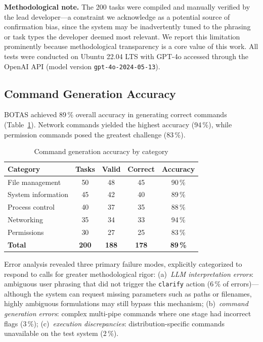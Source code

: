 \documentclass[10pt,a4paper]{article}
\begin{document}
\textbf{Methodological note.} The 200 tasks were compiled and manually verified by the lead developer---a constraint we acknowledge as a potential source of confirmation bias, since the system may be inadvertently tuned to the phrasing or task types the developer deemed most relevant. We report this limitation prominently because methodological transparency is a core value of this work. All tests were conducted on Ubuntu 22.04 LTS with GPT-4o accessed through the OpenAI API (model version \texttt{gpt-4o-2024-05-13}).

\subsection{Command Generation Accuracy}
\label{subsec:results-accuracy}

BOTAS achieved 89\,\% overall accuracy in generating correct commands (Table~\ref{tab:accuracy}). Network commands yielded the highest accuracy (94\,\%), while permission commands posed the greatest challenge (83\,\%).

\begin{table}[H]
    \centering
    \caption{Command generation accuracy by category}
    \label{tab:accuracy}
    \begin{tabular}{@{}lcccc@{}}
        \toprule
        \textbf{Category} & \textbf{Tasks} & \textbf{Valid} & \textbf{Correct} & \textbf{Accuracy} \\
        \midrule
        File management         & 50 & 48 & 45 & 90\,\% \\
        System information      & 45 & 42 & 40 & 89\,\% \\
        Process control         & 40 & 37 & 35 & 88\,\% \\
        Networking              & 35 & 34 & 33 & 94\,\% \\
        Permissions             & 30 & 27 & 25 & 83\,\% \\
        \midrule
        \textbf{Total}          & \textbf{200} & \textbf{188} & \textbf{178} & \textbf{89\,\%} \\
        \bottomrule
    \end{tabular}
\end{table}

Error analysis revealed three primary failure modes, explicitly categorized to respond to calls for greater methodological rigor: (a)~\textit{LLM interpretation errors}: ambiguous user phrasing that did not trigger the \texttt{clarify} action (6\,\% of errors)---although the system can request missing parameters such as paths or filenames, highly ambiguous formulations may still bypass this mechanism; (b)~\textit{command generation errors}: complex multi-pipe commands where one stage had incorrect flags (3\,\%); (c)~\textit{execution discrepancies}: distribution-specific commands unavailable on the test system (2\,\%).
\end{document}
